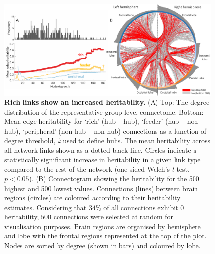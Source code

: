 \begin{figure}[h!]
\begin{center}
\includegraphics[width=1\textwidth]{Chapter5/Ch5Fig4.pdf}%
\end{center}
\caption{\textbf{Rich links show an increased heritability.}
(A) Top: The degree distribution of the representative group-level connectome. Bottom: Mean edge heritability for `rich' (hub -- hub), `feeder' (hub -- non-hub), `peripheral' (non-hub -- non-hub) connections as a function of degree threshold, \textit{k} used to define hubs. The mean heritability across all network links shown as a dotted black line. Circles indicate a statistically significant increase in heritability in a given link type compared to the rest of the network (one-sided Welch’s $t$-test, $p < 0.05$).
(B) Connectogram showing the heritability for the 500 highest and 500 lowest values. Connections (lines) between brain regions (circles) are coloured according to their heritability estimates. Considering that $34\%$ of all connections exhibit 0 heritability, 500 connections were selected at random for visualisation purposes. Brain regions are organised by hemisphere and lobe with the frontal regions represented at the top of the plot. Nodes are sorted by degree (shown in bars) and coloured by lobe.}
\label{fig:Ch5Fig4}
\end{figure}

